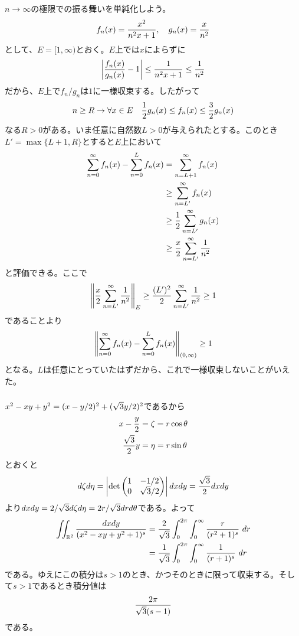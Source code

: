 \newpage



\subsubsection{}%
\begin{sol}
$n \to \infty$の極限での振る舞いを単純化しよう。
\[
f_n(x) = \frac{ x^2 }{ n^2 x + 1 }, \quad g_n(x) = \frac{x}{n^2}
\]
として、$E=[1, \infty)$とおく。$E$上では$x$によらずに
\[
\left \lvert  \frac{f_n(x)}{g_n(x)} - 1  \right \rvert \leq \frac{1}{n^2 x + 1} \leq \frac{1}{n^2}
\]
だから、$E$上で$f_n/g_n$は$1$に一様収束する。したがって
\[
n \geq R \to \forall x \in E \quad \frac{1}{2} g_n(x) \leq f_n(x) \leq \frac{3}{2} g_n(x)
\]
なる$R>0$がある。いま任意に自然数$L > 0$が与えられたとする。このとき$L'=\max \{ L+1,R  \}$とすると$E$上において
\begin{align*}
  \sum_{n=0}^{\infty} f_n(x) - \sum_{n=0}^{L} f_n(x) &= \sum_{n=L+1}^{\infty} f_n(x) \\
  &\geq \sum_{n=L'}^{\infty} f_n(x) \\
  &\geq \frac{1}{2}  \sum_{n=L'}^{\infty} g_n(x) \\
  &\geq \frac{x}{2}  \sum_{n=L'}^{\infty} \frac{1}{n^2}
\end{align*}
と評価できる。ここで
\[
\left \lVert  \frac{x}{2}  \sum_{n=L'}^{\infty} \frac{1}{n^2}  \right \rVert_E \geq \frac{(L')^2}{2}  \sum_{n=L'}^{\infty} \frac{1}{n^2} \geq 1
\]
であることより
\[
\left \lVert  \sum_{n=0}^{\infty} f_n(x) - \sum_{n=0}^{L} f_n(x)  \right \rVert_{(0, \infty)} \geq 1
\]
となる。$L$は任意にとっていたはずだから、これで一様収束しないことがいえた。
\end{sol}

\newpage


\subsubsection{}%
\begin{sol}
$x^2 - xy + y^2 = (x - y/2)^2 + (\sqrt{3}y/2)^2$であるから
\begin{align*}
  x - \frac{y}{2} &= \zeta = r \cos {\theta} \\
  \frac{\sqrt{3}}{2} y &= \eta = r \sin {\theta}
\end{align*}
とおくと
\[
d\zeta d \eta = \left \lvert  \det \begin{pmatrix} 1 & -1/2 \\ 0 & \sqrt{3}/2  \end{pmatrix}  \right \rvert dx dy = \frac{\sqrt{3}}{2} dx dy
\]
より$dx dy = 2/\sqrt{3} d\zeta d\eta = 2r/\sqrt{3} dr d{\theta}$である。よって
\begin{align*}
  \iint_{\R^2} \f{ dx dy }{  (x^2 - xy + y^2 + 1)^s } &= \f{2}{\s{3}} \int_0^{2\pi} \int_0^{\infty} \f{r}{(r^2 + 1)^s} \ dr \\
  &= \f{1}{\s{3}} \int_0^{2\pi} \int_0^{\infty} \f{1}{(r + 1)^s} \ dr
\end{align*}
である。ゆえにこの積分は$s > 1$のとき、かつそのときに限って収束する。そして$s > 1$であるとき積分値は
\[
\frac{2 \pi}{\sqrt{3} (s-1)}
\]
である。
\end{sol}
